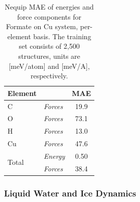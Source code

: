 \documentclass[%
reprint,
superscriptaddress,
nofootinbib,
amsmath,amssymb,
aps,
prl,
]{revtex4-1}
\begin{document}
\begin{table}[!htbp]
\centering
\begin{tabular}{llc}
\hline \hline
Element & & MAE \\
\hline
C & \textit{Forces} & 19.9  \\ \hline

O  & \textit{Forces} & 73.1  \\ \hline
                    
H & \textit{Forces} &  13.0 \\ \hline
                    
Cu & \textit{Forces} &  47.6 \\ \hline \hline

\multirow{2}{*}{Total}  & \textit{Energy} & 0.50   \\ 
                    & \textit{Forces} &  38.4 \\ \hline 
  \hline \hline
    \end{tabular}
    \caption{Nequip MAE of energies and force components for Formate on Cu system, per-element basis. The training set consists of 2,500 structures, units are [meV/atom] and [meV/A], respectively.}
    \label{table:fcu}
\end{table}


\subsubsection{Liquid Water and Ice Dynamics}
\end{document}
